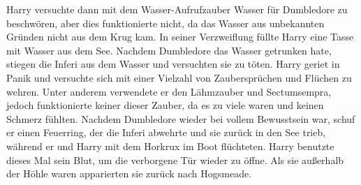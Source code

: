 \documentclass[a4paper, 10pt]{article}
\begin{document}
\vspace{10pt}
\newline
Harry versuchte dann mit dem Wasser-Aufrufzauber Wasser für Dumbledore zu beschwören, aber dies funktionierte nicht, da das Wasser aus unbekannten Gründen nicht aus dem Krug kam. In seiner Verzweiflung füllte Harry eine Tasse mit Wasser aus dem See. Nachdem Dumbledore das Wasser getrunken hate, stiegen die Inferi aus dem Wasser und versuchten sie zu töten. Harry geriet in Panik und versuchte sich mit einer Vielzahl von Zaubersprüchen und Flüchen zu wehren. Unter anderem verwendete er den Lähmzauber und Sectumsempra, jedoch funktionierte keiner dieser Zauber, da es zu viele waren und keinen Schmerz fühlten. Nachdem Dumbledore wieder bei vollem Bewusstsein war, schuf er einen Feuerring, der die Inferi abwehrte und sie zurück in den See trieb, während er und Harry mit dem Horkrux im Boot flüchteten. Harry benutzte dieses Mal sein Blut, um die verborgene Tür wieder zu öffne. Als sie außerhalb der Höhle waren apparierten sie zurück nach Hogsmeade.
\end{document}
